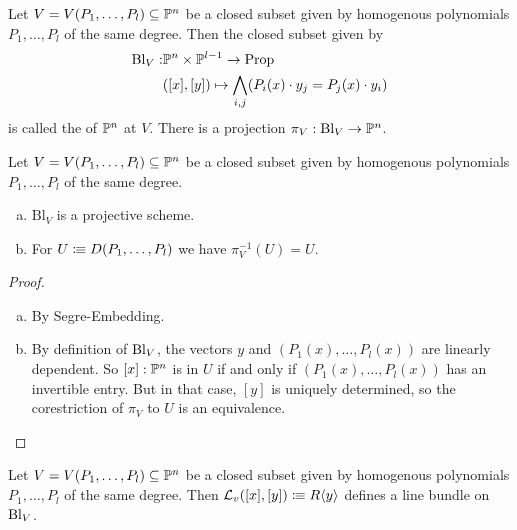 \begin{definition}
  Let $V=V(P_1,\dots,P_l)\subseteq \mathbb{P}^n$ be a closed subset given by homogenous polynomials $P_1,\dots,P_l$ of the same degree.
  Then the closed subset given by
  \begin{align*}
    \mathrm{Bl}_V:&\mathbb{P}^n\times \mathbb{P}^{l-1} \to \mathrm{Prop} \\
    &([x],[y])\mapsto \bigwedge_{i,j} (P_i(x)\cdot y_j=P_j(x)\cdot y_i)
  \end{align*}
  is called the  of $\mathbb{P}^n$ at $V$.
  There is a projection $\pi_V:\mathrm{Bl}_V\to \mathbb{P}^n$.
\end{definition}

\begin{proposition}
  Let $V=V(P_1,\dots,P_l)\subseteq \mathbb{P}^n$ be a closed subset given by homogenous polynomials $P_1,\dots,P_l$ of the same degree.
  \begin{enumerate}[(a)]
  \item $\mathrm{Bl}_V$ is a projective scheme.
  \item For $U\vcentcolon\mspace{-1.2mu}\equiv D(P_1,\dots,P_l)$ we have $\pi_V^{-1}(U)=U$.
  \end{enumerate}
\end{proposition}

\begin{proof}
  \begin{enumerate}[(a)]
  \item By Segre-Embedding.
  \item By definition of $\mathrm{Bl}_V$, the vectors $y$ and $(P_1(x),\dots,P_l(x))$ are linearly dependent.
    So $[x]:\mathbb{P}^n$ is in $U$ if and only if $(P_1(x),\dots,P_l(x))$ has an invertible entry.
    But in that case, $[y]$ is uniquely determined, so the corestriction of $\pi_V$ to $U$ is an equivalence.
  \end{enumerate}
\end{proof}

\begin{definition}
  Let $V=V(P_1,\dots,P_l)\subseteq \mathbb{P}^n$ be a closed subset given by homogenous polynomials $P_1,\dots,P_l$ of the same degree.
  Then $\mathcal L_v([x],[y])\vcentcolon\mspace{-1.2mu}\equiv R\langle y\rangle$ defines a line bundle on $\mathrm{Bl}_V$.
\end{definition}